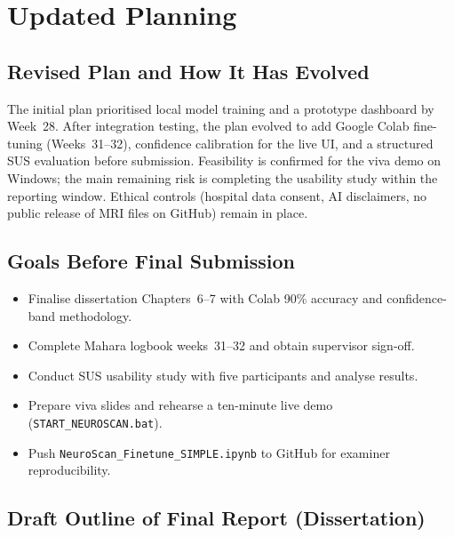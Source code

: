 \documentclass[11pt,a4paper]{article}
\begin{document}
\section{Updated Planning}

\subsection{Revised Plan and How It Has Evolved}

The initial plan prioritised local model training and a prototype dashboard by Week~28. After integration testing, the plan evolved to add Google Colab fine-tuning (Weeks~31--32), confidence calibration for the live UI, and a structured SUS evaluation before submission. Feasibility is confirmed for the viva demo on Windows; the main remaining risk is completing the usability study within the reporting window. Ethical controls (hospital data consent, AI disclaimers, no public release of MRI files on GitHub) remain in place.

\subsection{Goals Before Final Submission}

\begin{itemize}[noitemsep]
  \item Finalise dissertation Chapters~6--7 with Colab 90\% accuracy and confidence-band methodology.
  \item Complete Mahara logbook weeks~31--32 and obtain supervisor sign-off.
  \item Conduct SUS usability study with five participants and analyse results.
  \item Prepare viva slides and rehearse a ten-minute live demo (\texttt{START\_NEUROSCAN.bat}).
  \item Push \texttt{NeuroScan\_Finetune\_SIMPLE.ipynb} to GitHub for examiner reproducibility.
\end{itemize}

\subsection{Draft Outline of Final Report (Dissertation)}
\end{document}
